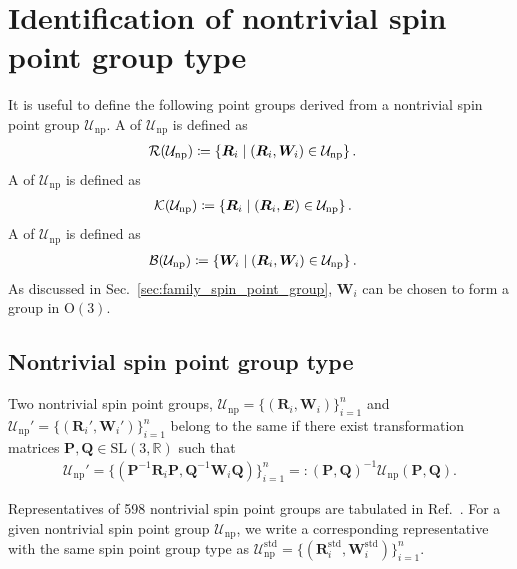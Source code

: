 \section{Identification of nontrivial spin point group type}

It is useful to define the following point groups derived from a nontrivial spin point group $\mathcal{U}_{\mathrm{np}}$.
A  of $\mathcal{U}_{\mathrm{np}}$ is defined as
\begin{align}
  \mathcal{R}(\mathcal{U}_{\mathrm{np}})
    &\coloneqq \left\{  \bm{R}_{i}  \mathrel{}\middle|\mathrel{}  (\bm{R}_{i}, \bm{W}_{i}) \in \mathcal{U}_{\mathrm{np}}  \right\}.
\end{align}
A  of $\mathcal{U}_{\mathrm{np}}$ is defined as
\begin{align}
  \mathcal{K}(\mathcal{U}_{\mathrm{np}})
    &\coloneqq \left\{  \bm{R}_{i}  \mathrel{}\middle|\mathrel{}  (\bm{R}_{i}, \bm{E}) \in \mathcal{U}_{\mathrm{np}}  \right\}.
\end{align}
A  of $\mathcal{U}_{\mathrm{np}}$ is defined as
\begin{align}
  \mathcal{B}(\mathcal{U}_{\mathrm{np}})
    &\coloneqq \left\{  \bm{W}_{i}  \mathrel{}\middle|\mathrel{}  (\bm{R}_{i}, \bm{W}_{i}) \in \mathcal{U}_{\mathrm{np}}  \right\}.
\end{align}
As discussed in Sec.~\ref{sec:family_spin_point_group}, $\bm{W}_{i}$ can be chosen to form a group in $\mathrm{O}(3)$.

\subsection{Nontrivial spin point group type}

Two nontrivial spin point groups, $\mathcal{U}_{\mathrm{np}} = \{ (\bm{R}_{i}, \bm{W}_{i}) \}_{i=1}^{n}$ and $\mathcal{U}_{\mathrm{np}}'= \{ (\bm{R}_{i}', \bm{W}_{i}') \}_{i=1}^{n}$ belong to the same  if there exist transformation matrices $\bm{P}, \bm{Q} \in \mathrm{SL}(3, \mathbb{R})$ such that
\begin{align}
  \mathcal{U}_{\mathrm{np}}'
    = \{ (\bm{P}^{-1} \bm{R}_{i} \bm{P}, \bm{Q}^{-1} \bm{W}_{i} \bm{Q}) \}_{i=1}^{n}
    =: (\bm{P}, \bm{Q})^{-1} \mathcal{U}_{\mathrm{np}} (\bm{P}, \bm{Q}).
\end{align}

Representatives of 598 nontrivial spin point groups are tabulated in Ref.~\cite{Litvin:a14103}.
For a given nontrivial spin point group $\mathcal{U}_{\mathrm{np}}$, we write a corresponding representative with the same spin point group type as $\mathcal{U}_{\mathrm{np}}^{\mathrm{std}} = \{ (\bm{R}_{i}^{\mathrm{std}}, \bm{W}_{i}^{\mathrm{std}}) \}_{i=1}^{n}$.

